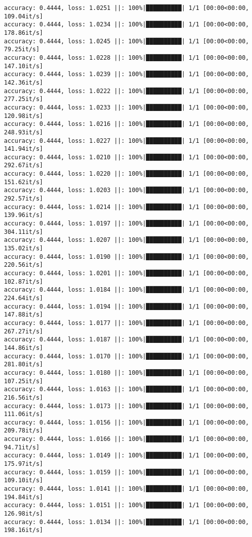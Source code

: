 \documentclass[
]{article}
\begin{document}
\begin{verbatim}
accuracy: 0.4444, loss: 1.0251 ||: 100%|██████████| 1/1 [00:00<00:00, 109.04it/s]
accuracy: 0.4444, loss: 1.0234 ||: 100%|██████████| 1/1 [00:00<00:00, 178.86it/s]
accuracy: 0.4444, loss: 1.0245 ||: 100%|██████████| 1/1 [00:00<00:00, 79.25it/s]
accuracy: 0.4444, loss: 1.0228 ||: 100%|██████████| 1/1 [00:00<00:00, 147.10it/s]
accuracy: 0.4444, loss: 1.0239 ||: 100%|██████████| 1/1 [00:00<00:00, 142.36it/s]
accuracy: 0.4444, loss: 1.0222 ||: 100%|██████████| 1/1 [00:00<00:00, 277.25it/s]
accuracy: 0.4444, loss: 1.0233 ||: 100%|██████████| 1/1 [00:00<00:00, 120.98it/s]
accuracy: 0.4444, loss: 1.0216 ||: 100%|██████████| 1/1 [00:00<00:00, 248.93it/s]
accuracy: 0.4444, loss: 1.0227 ||: 100%|██████████| 1/1 [00:00<00:00, 141.94it/s]
accuracy: 0.4444, loss: 1.0210 ||: 100%|██████████| 1/1 [00:00<00:00, 292.67it/s]
accuracy: 0.4444, loss: 1.0220 ||: 100%|██████████| 1/1 [00:00<00:00, 151.62it/s]
accuracy: 0.4444, loss: 1.0203 ||: 100%|██████████| 1/1 [00:00<00:00, 292.57it/s]
accuracy: 0.4444, loss: 1.0214 ||: 100%|██████████| 1/1 [00:00<00:00, 139.96it/s]
accuracy: 0.4444, loss: 1.0197 ||: 100%|██████████| 1/1 [00:00<00:00, 304.11it/s]
accuracy: 0.4444, loss: 1.0207 ||: 100%|██████████| 1/1 [00:00<00:00, 135.02it/s]
accuracy: 0.4444, loss: 1.0190 ||: 100%|██████████| 1/1 [00:00<00:00, 220.56it/s]
accuracy: 0.4444, loss: 1.0201 ||: 100%|██████████| 1/1 [00:00<00:00, 102.87it/s]
accuracy: 0.4444, loss: 1.0184 ||: 100%|██████████| 1/1 [00:00<00:00, 224.64it/s]
accuracy: 0.4444, loss: 1.0194 ||: 100%|██████████| 1/1 [00:00<00:00, 147.88it/s]
accuracy: 0.4444, loss: 1.0177 ||: 100%|██████████| 1/1 [00:00<00:00, 267.27it/s]
accuracy: 0.4444, loss: 1.0187 ||: 100%|██████████| 1/1 [00:00<00:00, 144.86it/s]
accuracy: 0.4444, loss: 1.0170 ||: 100%|██████████| 1/1 [00:00<00:00, 281.80it/s]
accuracy: 0.4444, loss: 1.0180 ||: 100%|██████████| 1/1 [00:00<00:00, 107.25it/s]
accuracy: 0.4444, loss: 1.0163 ||: 100%|██████████| 1/1 [00:00<00:00, 216.56it/s]
accuracy: 0.4444, loss: 1.0173 ||: 100%|██████████| 1/1 [00:00<00:00, 111.06it/s]
accuracy: 0.4444, loss: 1.0156 ||: 100%|██████████| 1/1 [00:00<00:00, 209.78it/s]
accuracy: 0.4444, loss: 1.0166 ||: 100%|██████████| 1/1 [00:00<00:00, 94.71it/s]
accuracy: 0.4444, loss: 1.0149 ||: 100%|██████████| 1/1 [00:00<00:00, 175.97it/s]
accuracy: 0.4444, loss: 1.0159 ||: 100%|██████████| 1/1 [00:00<00:00, 109.10it/s]
accuracy: 0.4444, loss: 1.0141 ||: 100%|██████████| 1/1 [00:00<00:00, 194.84it/s]
accuracy: 0.4444, loss: 1.0151 ||: 100%|██████████| 1/1 [00:00<00:00, 126.98it/s]
accuracy: 0.4444, loss: 1.0134 ||: 100%|██████████| 1/1 [00:00<00:00, 198.16it/s]

\end{verbatim}
\end{document}
